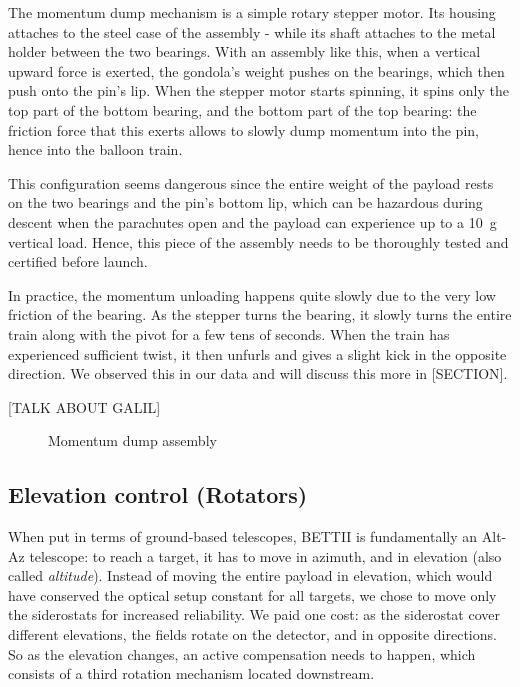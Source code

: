 The momentum dump mechanism is a simple rotary stepper motor. Its housing attaches to the steel case of the assembly - while its shaft attaches to the metal holder between the two bearings. With an assembly like this, when a vertical upward force is exerted, the gondola's weight pushes on the bearings, which then push onto the pin's lip. When the stepper motor starts spinning, it spins only the top part of the bottom bearing, and the bottom part of the top bearing: the friction force that this exerts allows to slowly dump momentum into the pin, hence into the balloon train. 

This configuration seems dangerous since the entire weight of the payload rests on the two bearings and the pin's bottom lip, which can be hazardous during descent when the parachutes open and the payload can experience up to a 10~g vertical load. Hence, this piece of the assembly needs to be thoroughly tested and certified before launch. 

In practice, the momentum unloading happens quite slowly due to the very low friction of the bearing. As the stepper turns the bearing, it slowly turns the entire train along with the pivot for a few tens of seconds. When the train has experienced sufficient twist, it then unfurls and gives a slight kick in the opposite direction. We observed this in our data and will discuss this more in [SECTION].

[TALK ABOUT GALIL]
\begin{figure}[!ht]
	\centering
	
	\caption[Momentum dump assembly]{Momentum dump assembly}
	\label{fig:rotator}
    \end{figure}


\subsection{Elevation control (Rotators)}

When put in terms of ground-based telescopes, BETTII is fundamentally an Alt-Az telescope: to reach a target, it has to move in azimuth, and in elevation (also called \textit{altitude}). Instead of moving the entire payload in elevation, which would have conserved the optical setup constant for all targets, we chose to move only the siderostats for increased reliability. We paid one cost: as the siderostat cover different elevations, the fields rotate on the detector, and in opposite directions. So as the elevation changes, an active compensation needs to happen, which consists of a third rotation mechanism located downstream.

